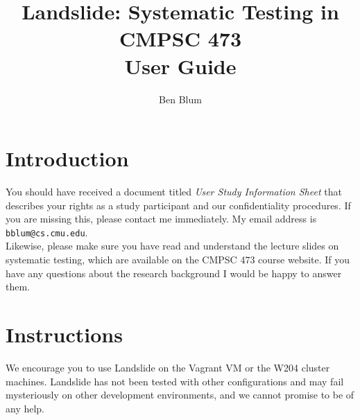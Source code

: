 \documentclass{article}
\begin{document}

\newcommand\classname{CMPSC 473\xspace}
\title{\bf Landslide: Systematic Testing in \classname \\ User Guide}
\author{Ben Blum}
\date{}
\maketitle

\section{Introduction}

You should have received a document titled {\em User Study Information Sheet} that describes your rights as a study
participant and our confidentiality procedures. If you are missing this, please contact me immediately. My email
address is {\tt bblum@cs.cmu.edu}.
\\

\noindent Likewise, please make sure you have read and understand the lecture slides on systematic testing, which are
available on the \classname course website. If you have any questions about the research background I would be
happy to answer them.

\section{Instructions}

We encourage you to use Landslide on the Vagrant VM or the W204 cluster machines.
Landslide has not been tested with other configurations and may fail
mysteriously on other development environments, and we cannot promise to be of any help.
\end{document}
